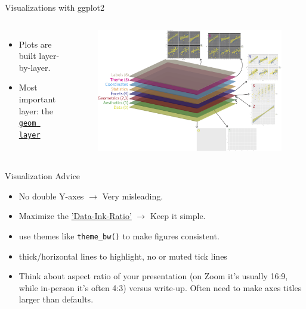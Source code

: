 \documentclass[12pt,aspectratio=169]{beamer}
\begin{document}
\begin{frame}{Visualizations with ggplot2}
 \begin{columns}[c]
        \begin{itemize}
            \item Plots are built layer-by-layer.
            \item Most important layer: the \texttt{\href{https://ggplot2.tidyverse.org/reference/}{geom layer}}
        \end{itemize}
        \begin{figure}
        \centering
        \includegraphics[width=1.0\linewidth,height=0.8\textheight,keepaspectratio]{resources/ggplot_grammar.png}
        \end{figure}
    \end{columns}
\end{frame}

\begin{frame}{Visualization Advice}
    \begin{itemize}
        \item No double Y-axes $\rightarrow$ Very misleading.
        \item Maximize the \href{http://www-personal.umich.edu/~jpboyd/eng403_chap2_tuftegospel.pdf}{'Data-Ink-Ratio'} $\rightarrow $ Keep it simple.
        \item use themes like \texttt{theme\_bw()} to make figures consistent.
        \item thick/horizontal lines to highlight, no or muted tick lines
        \item Think about aspect ratio of your presentation (on Zoom it's usually 16:9, while in-person it's often 4:3) versus write-up. Often need to make axes titles larger than defaults.
    \end{itemize}
\end{frame}
\end{document}
